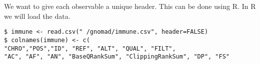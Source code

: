 \documentclass{article}
\begin{document}
We want to give each observable a unique header. This can be done using R.
In R we will load the data.


\medskip \texttt{\$ 
immune <- read.csv("~/gnomad/immune.csv", header=FALSE)\\
\$ colnames(immune) <- c(\\
"CHRO","POS","ID", "REF", "ALT", "QUAL", "FILT",\\
"AC", "AF", "AN", "BaseQRankSum", "ClippingRankSum", "DP", "FS"\\
}
\end{document}
